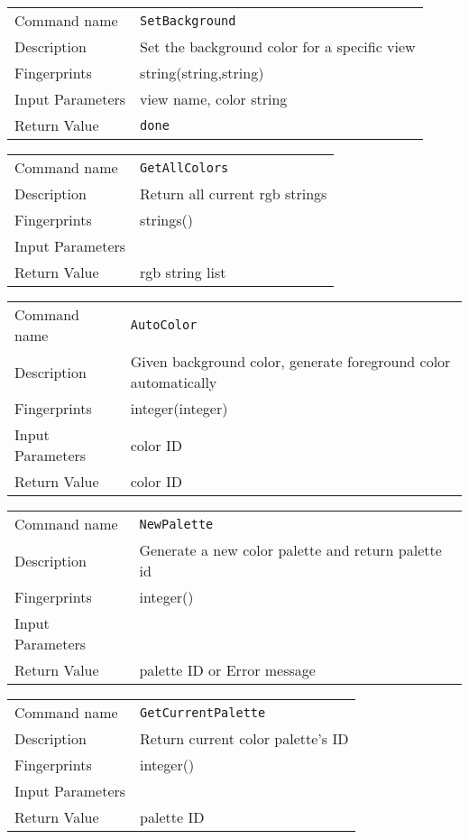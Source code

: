\noindent
\begin{tabular}{l|p{5in}}
\hline
Command name &{\tt SetBackground }\\ 
Description &
Set the background color for a specific view
 	\\
Fingerprints & string(string,string)\\
Input Parameters& view name, color string\\
Return Value&{\tt done}\\
\hline
\end{tabular}
\bigskip

\noindent
\begin{tabular}{l|p{5in}}
\hline
Command name &{\tt GetAllColors }\\ 
Description &
Return all current rgb strings
 	\\
Fingerprints & strings()\\
Input Parameters&\\
Return Value&rgb string list\\
\hline
\end{tabular}
\bigskip

\noindent
\begin{tabular}{l|p{5in}}
\hline
Command name &{\tt AutoColor }\\ 
Description &
Given background color, generate foreground color automatically
 	\\
Fingerprints & integer(integer)\\
Input Parameters&color ID\\
Return Value&color ID\\
\hline
\end{tabular}
\bigskip

\noindent
\begin{tabular}{l|p{5in}}
\hline
Command name &{\tt NewPalette }\\ 
Description &
Generate a new color palette and return palette id
 	\\
Fingerprints & integer()\\
Input Parameters&\\
Return Value&palette ID or Error message\\
\hline
\end{tabular}
\bigskip

\noindent
\begin{tabular}{l|p{5in}}
\hline
Command name &{\tt GetCurrentPalette }\\ 
Description &
Return current color palette's ID
 	\\
Fingerprints & integer()\\
Input Parameters&\\
Return Value&palette ID\\
\hline
\end{tabular}
\bigskip

